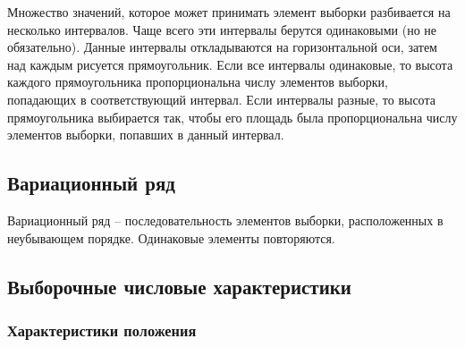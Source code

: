 Множество значений, которое может принимать элемент выборки разбивается на несколько интервалов. Чаще всего эти интервалы берутся одинаковыми (но не обязательно). Данные интервалы откладываются на горизонтальной оси, затем над каждым рисуется прямоугольник. Если все интервалы одинаковые, то высота каждого прямоугольника пропорциональна числу элементов выборки, попадающих в соответствующий интервал. Если интервалы разные, то высота прямоугольника выбирается так, чтобы его площадь была пропорциональна числу элементов выборки, попавших в данный интервал.

\subsection{Вариационный ряд}

Вариационный ряд -- последовательность элементов выборки, расположенных в неубывающем порядке. Одинаковые элементы повторяются.

\subsection{Выборочные числовые характеристики}

\subsubsection{Характеристики положения}

